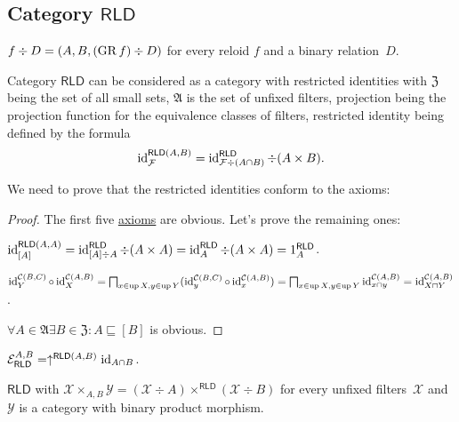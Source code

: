 \subsection{\texorpdfstring{Category $\mathsf{RLD}$}{Category RLD}}

\begin{defn}
  $f \div D = (A, B, (\operatorname{GR} f) \div D)$ for every
  reloid $f$ and a binary relation~$D$.
\end{defn}

Category $\mathsf{RLD}$
can be considered as a category with restricted identities
with $\mathfrak{Z}$ being the set of all
small sets, $\mathfrak{A}$ is the set of unfixed filters,
projection being the projection function for the
equivalence classes of filters,
restricted identity being defined by the formula
\[\operatorname{id}^{\mathsf{RLD}(A,B)}_{\mathcal{F}} =
\operatorname{id}^{\mathsf{RLD}}_{\mathcal{F}\div(A\cap B)}
\div(A\times B).\]

We need to prove that the restricted identities
conform to the axioms:

\begin{proof}
The first five \hyperref[unf-mor]{axioms} are obvious. Let's prove the
remaining ones:

$\operatorname{id}^{\mathsf{RLD}(A,A)}_{[A]} =
\operatorname{id}^{\mathsf{RLD}}_{[A]\div A}\div(A\times A) =
\operatorname{id}^{\mathsf{RLD}}_A\div(A\times A) =
1^{\mathsf{RLD}}_A$.

$\operatorname{id}^{\mathcal{C}(B,C)}_Y \circ \operatorname{id}^{\mathcal{C}(A,B)}_X =
\bigsqcap_{x\in\operatorname{up} X,y\in\operatorname{up} Y}
(\operatorname{id}^{\mathcal{C}(B,C)}_y \circ \operatorname{id}^{\mathcal{C}(A,B)}_x)=
\bigsqcap_{x\in\operatorname{up} X,y\in\operatorname{up} Y}
\operatorname{id}^{\mathcal{C}(A,B)}_{x\cap y}=
\operatorname{id}^{\mathcal{C}(A,B)}_{X\sqcap Y}$.

$\forall A\in\mathfrak{A}\exists B\in\mathfrak{Z}:
A\sqsubseteq[B]$ is obvious.
\end{proof}

\begin{obvious}
$\mathcal{E}_{\mathsf{RLD}}^{A,B} = \uparrow^{\mathsf{RLD} (A ,
B)} \operatorname{id}_{A \cap B}$.
\end{obvious}

\begin{prop}
$\mathsf{RLD}$ with
$\mathcal{X}\times_{A,B}\mathcal{Y}=
(\mathcal{X}\div A)\times^{\mathsf{RLD}}(\mathcal{X}\div B)$
for every unfixed filters~$\mathcal{X}$
and~$\mathcal{Y}$
is a category with binary product morphism.
\end{prop}

